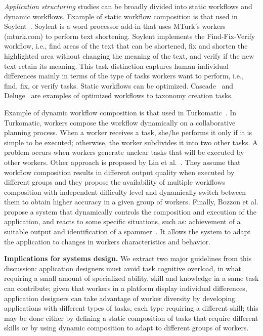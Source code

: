 \documentclass[11pt]{bmc_article_s50}
\begin{document}
\textit{Application structuring} studies can be broadly divided into static workflows and dynamic workflows. Example of static workflow composition is that used in Soylent~\cite{Bernstein:2010}. Soylent is a word processor add-in that uses MTurk's workers (mturk.com) to perform text shortening. Soylent implements the Find-Fix-Verify workflow, i.e., find areas of the text that can be shortened, fix and shorten the highlighted area without changing the meaning of the text, and verify if the new text retain its meaning. This task distinction captures human individual differences mainly in terms of the type of tasks workers want to perform, i.e., find, fix, or verify tasks. Static workflows can be optimized. Cascade~\cite{Chilton:2013} and Deluge~\cite{Bragg:2013} are examples of optimized workflows to taxonomy creation tasks.

Example of dynamic workflow composition is that used in Turkomatic~\cite{Kulkarni2012}. In Turkomatic, workers compose the workflow dynamically on a collaborative planning process. When a worker receives a task, she/he performs it only if it is simple to be executed; otherwise, the worker subdivides it into two other tasks. A problem occurs when workers generate unclear tasks that will be executed by other workers. Other approach is proposed by Lin et al.~\cite{Christopher:2012}. They assume that workflow composition results in different output quality when executed by different groups and they propose the availability of multiple workflows composition with independent difficulty level and dynamically switch between them to obtain higher accuracy in a given group of workers. Finally, Bozzon et al. propose a system that dynamically controls the composition and execution of the application, and reacts to some specific situations, such as: achievement of a suitable output and identification of a spammer~\cite{Bozzon:2013}. It allows the system to adapt the application to changes in workers characteristics and behavior.

\textbf{Implications for systems design.} We extract two major guidelines from this discussion:  application designers must avoid task cognitive overload, in what requiring a small amount of specialized ability, skill and knowledge in a same task can contribute;  given that workers in a platform display individual differences, application designers can take advantage of worker diversity by developing applications with different types of tasks, each type requiring a different skill; this may be done either by defining a static composition of tasks that require different skills or by using dynamic composition to adapt to different groups of workers.
\end{document}
